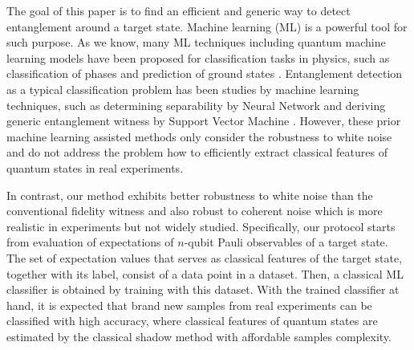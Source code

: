 \documentclass[
aps,
pra,
twocolumn,
floatfix,
]{revtex4-2}
\theoremstyle{plain}
\theoremstyle{definition}
\newcommand{\entangled}{\textsf{entangled}}
\begin{document}
The goal of this paper is to find an efficient and generic way to detect entanglement around a target state. 
Machine learning (ML) is a powerful tool for such purpose. 
As we know, many ML techniques including quantum machine learning models \cite{congQuantumConvolutionalNeural2019} have been proposed for classification tasks in physics, such as classification of phases and prediction of ground states \cite{carrasquillaMachineLearningPhases2017} \cite{huangProvablyEfficientMachine2022}.
Entanglement detection as a typical classification problem has been studies by machine learning techniques, such as determining separability by Neural Network \cite{luSeparabilityEntanglementClassifierMachine2018} \cite{maTransformingBellInequalities2018} and deriving generic entanglement witness by Support Vector Machine \cite{zhuMachineLearningDerivedEntanglement2021} \cite{vintskevichClassificationFourqubitEntangled2022}. 
However, these prior machine learning assisted methods only consider the robustness to white noise and do not address the problem how to efficiently extract classical features of quantum states in real experiments.

In contrast, our method exhibits better robustness to white noise than the conventional fidelity witness and also robust to coherent noise which is more realistic in experiments but not widely studied.
Specifically, our protocol starts from evaluation of expectations of $n$-qubit Pauli observables of a target state. 
The set of expectation values that serves as classical features of the target state, together with its label, consist of a data point in a dataset.
Then, a classical ML classifier is obtained by training with this dataset.
With the trained classifier at hand, it is expected that brand new samples from real experiments can be classified with high accuracy, 
where classical features of quantum states are estimated by the classical shadow method \cite{huangPredictingManyProperties2020} with affordable samples complexity.
\end{document}
